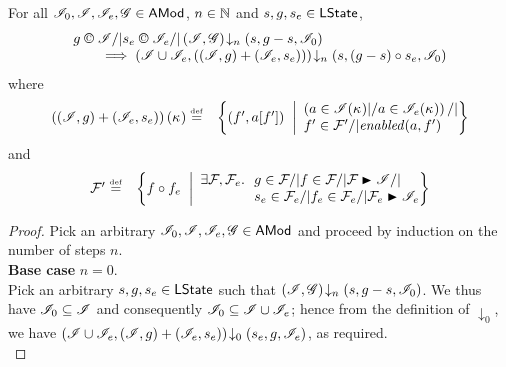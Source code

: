 \begin{lemma}\label{extend-closure-2}
For all $\mathscr{I}_0, \mathscr{I}{}, \mathscr{I}_{e}, \mathscr{G} \in \textsf{AMod}$, $n \in \mathbb{N}$ and $s, g, s_e \in \textsf{LState}$,
\[
\begin{array}{l}
	g \confines \lmod /| s_e \confines \lmod_{e} /| 
	\extendsAMUpto{\lmod, \gmod}{n}{s}{g-s}{\lmod_0}\\
	\qquad\implies
	\extendsAMUpto{\lmod \cup \lmod_{e}, \left( (\lmod, g) + (\lmod_{e}, s_e) \right)}{n}{s}{(g-s) \composeL s_e}{\lmod_{0}}
\end{array}
\]
%
where
%
\[
\begin{array}{@{} l  l @{}}
	\left( (\lmod, g) + (\lmod_{e}, s_e) \right)(\ca{}) \eqdef  & 
	\left\{
		(f', a[f']) \;\;\middle|
		\begin{array}{ l @{}}
			\left(a \in \lmod(\ca{}) |/ a \in \lmod_{e}(\ca{})  \right) /| \\
			f' \in \fence{}' /| \m{enabled}(a, f')	
		\end{array}		  
	\right\}\\
\end{array}
\]
%
and
%
\[
\begin{array}{@{} l l @{}}
	\fence{}' \eqdef & 
	\left\{
		f \composeL f_{e} \;\;\middle| 
		\begin{array}{l @{\hspace{5pt}} l @{}}
			\exsts{\fence{}, \fence{e}} & g \in \fence{} /| f \in \fence{} /| \fence{} \strictfences \lmod /| \\
			& s_{e} \in \fence{e} /| f_{e} \in \fence{e} /| \fence{e} \strictfences \lmod_{e} 
		\end{array}
	\right\}
\end{array}
\]
%
\begin{proof}
Pick an arbitrary $\mathscr{I}_0, \mathscr{I}, \mathscr{I}_{e}, \mathscr{G} \in \textsf{AMod}$ and proceed by induction on the number of steps $n$. \\

\noindent\textbf{Base case }$n = 0$.\\
Pick an arbitrary $s, g, s_e \in \textsf{LState}$ such that $\left(\mathscr{I}, \mathscr{G}\right) \!\downarrow_{n} \left(s, g-s, \mathscr{I}_0\right)$. We thus have $\mathscr{I}_{0} \subseteq \mathscr{I}$ and consequently $\mathscr{I}_{0} \subseteq \mathscr{I} \cup \mathscr{I}_{e}$; hence from the definition of $\downarrow_{0}$, we have $\left(\mathscr{I} \cup \mathscr{I}_{e}, (\mathscr{I}, g) + (\mathscr{I}_{e}, s_e)\right) \!\downarrow_{0} \left(s_{e}, g, \mathscr{I}_{e}\right)$, as required.\\


\end{proof}
\end{lemma}
